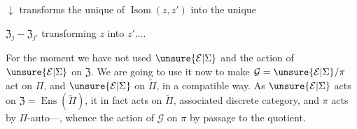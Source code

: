 $\downarrow$ transforms the unique  of $\operatorname{Isom}(z,z')$ into the unique  $\mathfrak Z_j\mathbin{-}\mathfrak Z_{j'}$ transforming $z$ into $z'\ldots.$

For the moment we have not used $\unsure{\mathcal E|\Sigma}$ and the action of $\unsure{\mathcal E|\Sigma}$ on $\mathfrak Z$. We are going to use it now to make $\mathcal G=\unsure{\mathcal E|\Sigma}/\pi$ act on $\Pi$, and $\unsure{\mathcal E|\Sigma}$ on $\widetilde\Pi$, in a compatible way.
As $\unsure{\mathcal E|\Sigma}$ acts on $\mathfrak Z=\operatorname{Ens}(\widetilde\Pi)$, it in fact acts on $\widetilde\Pi$, associated discrete category,  and  $\pi$ acts by $\Pi$-auto---, whence the action of $\mathcal G$ on $\pi$ by passage to the quotient.

